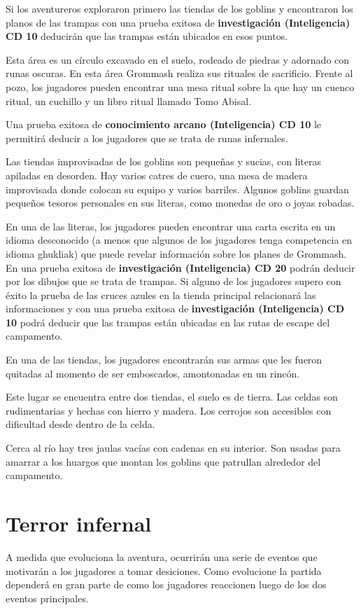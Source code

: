 \documentclass[10pt,twoside,twocolumn,openany]{dndbook}
\begin{document}
Si los aventureros exploraron primero las tiendas de los goblins y encontraron los planos de las 
trampas con una prueba exitosa de \textbf{investigación (Inteligencia) CD 10} deducirán que las 
trampas están ubicados en esos puntos.

Esta área es un círculo excavado en el suelo, rodeado de piedras y adornado con runas oscuras. En 
esta área Grommash realiza sus rituales de sacrificio. Frente al pozo, los jugadores pueden 
encontrar una mesa ritual sobre la que hay un cuenco ritual, un cuchillo y un libro ritual
llamado Tomo Abisal.

Una prueba exitosa de \textbf{conocimiento arcano (Inteligencia) CD 10} le permitirá deducir a 
los jugadores que se trata de runas infernales.

Las tiendas improvisadas de los goblins son pequeñas y sucias, con literas apiladas en desorden. 
Hay varios catres de cuero, una mesa de madera improvisada donde colocan su equipo y varios 
barriles. Algunos goblins guardan pequeños tesoros personales en sus literas, como monedas de oro 
o joyas robadas.

En una de las literas, los jugadores pueden encontrar una carta escrita en un idioma desconocido 
(a menos que algunos de los jugadores tenga competencia en idioma ghukliak) que 
puede revelar información sobre los planes de Grommash. En una prueba exitosa de 
\textbf{investigación (Inteligencia) CD 20} podrán deducir por los dibujos que se trata de 
trampas. Si alguno de los jugadores supero con éxito la prueba de las cruces azules en la tienda 
principal relacionará las informaciones y con una prueba exitosa de 
\textbf{investigación (Inteligencia) CD 10} podrá deducir que las trampas están ubicadas en las
rutas de escape del campamento.

En una de las tiendas, los jugadores encontrarán sus armas que les fueron quitadas al momento de 
ser emboscados, amontonadas en un rincón.

Este lugar se encuentra entre dos tiendas, el suelo es de tierra. Las celdas son rudimentarias
y hechas con hierro y madera. Los cerrojos son accesibles con dificultad desde dentro de la celda.

Cerca al río hay tres jaulas vacías con cadenas en su interior. Son usadas para amarrar a los 
huargos que montan los goblins que patrullan alrededor del campamento.

\section{Terror infernal}
A medida que evoluciona la aventura, ocurrirán una serie de eventos que motivarán a los jugadores 
a tomar desiciones. Como evolucione la partida dependerá en gran parte de como los jugadores 
reaccionen luego de los dos eventos principales.
\end{document}
